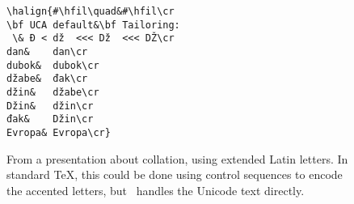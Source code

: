 \begin{figure}[htb]
\small
\begin{minipage}{0.5\hsize}
\begin{verbatim}
\halign{#\hfil\quad&#\hfil\cr
\bf UCA default&\bf Tailoring:
 \& Ð < dž  <<< Dž  <<< DŽ\cr   
dan&    dan\cr
dubok&  dubok\cr
džabe&  đak\cr
džin&   džabe\cr
Džin&   džin\cr
đak&    Džin\cr
Evropa& Evropa\cr}
\end{verbatim}
\end{minipage}%
\begin{minipage}{0.5\hsize}
\end{minipage}
\caption{From a presentation about collation, using extended Latin letters. In standard \TeX, this could be done using control sequences to encode the accented letters, but \XeTeX\ handles the Unicode text directly.}
\end{figure}
 